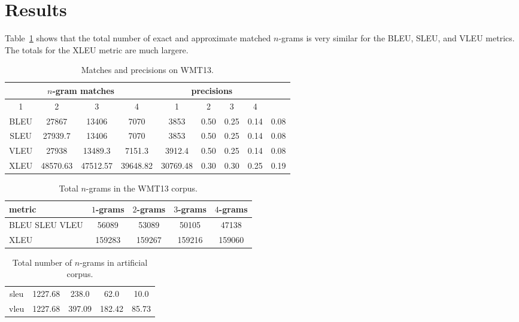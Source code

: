 
\section{Results}
\label{sec:results}

Table~\ref{tab:matchesandprecisionswmt13} shows that the total number of exact and approximate matched $n$-grams is very similar for the BLEU, SLEU, and VLEU metrics. 
The totals for the XLEU metric are much largere. 

\begin{table}[h]
  \centering
  \begin{tabular}{|c|c|c|c|c|c|c|c|c|}
\hline
\multicolumn{4}{c}{$n$-gram matches} & \multicolumn{4}{c}{precisions} \\
\hline
1 & 2 & 3 & 4 & 1 & 2 & 3 & 4 \\
\hline
BLEU & 27867 & 13406 & 7070 & 3853 & 0.50 & 0.25 & 0.14 & 0.08 \\
SLEU & 27939.7 & 13406 & 7070 & 3853 & 0.50 & 0.25 & 0.14 & 0.08 \\
VLEU & 27938 & 13489.3 & 7151.3 & 3912.4 & 0.50 & 0.25 & 0.14 & 0.08 \\
XLEU & 48570.63 & 47512.57 & 39648.82 & 30769.48 & 0.30 & 0.30 & 0.25 & 0.19 \\
\hline
  \end{tabular}
  \caption{Matches and precisions on WMT13.}
  \label{tab:matchesandprecisionswmt13}
\end{table}



\begin{table}[h]
  \centering
  \begin{tabular}{|l||c|c|c|c|}
    \hline
metric & $1$-grams & $2$-grams & $3$-grams & $4$-grams \\
\hline
BLEU SLEU VLEU & 56089 &  53089 & 50105 & 47138 \\
XLEU & 159283 & 159267 & 159216 & 159060 \\
\hline
  \end{tabular}
  \caption{Total $n$-grams in the WMT13 corpus.}
  \label{tab:totalwmt13ngrams}
\end{table}

\begin{table}
  \centering
  \begin{tabular}{|c|c|c|c|c|}
\hline
sleu & 1227.68 & 238.0 & 62.0 & 10.0 \\
vleu& 1227.68 & 397.09 & 182.42 & 85.73 \\
\hline
  \end{tabular}
  \caption{Total number of $n$-grams in artificial corpus.}
  \label{tab:artificialtotalngrams}
\end{table}

